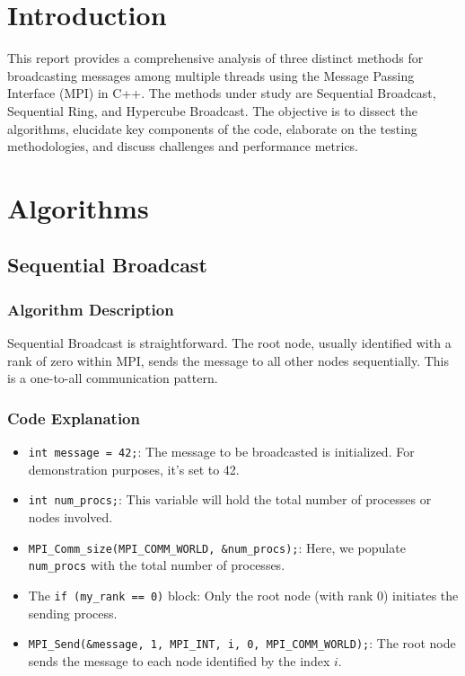 \documentclass[11pt]{article}
\begin{document}
\maketitle
\thispagestyle{empty}
\newpage

\tableofcontents
\newpage

\section{Introduction}
This report provides a comprehensive analysis of three distinct methods for broadcasting messages among multiple threads using the Message Passing Interface (MPI) in C++. The methods under study are Sequential Broadcast, Sequential Ring, and Hypercube Broadcast. The objective is to dissect the algorithms, elucidate key components of the code, elaborate on the testing methodologies, and discuss challenges and performance metrics.

\section{Algorithms}

\subsection{Sequential Broadcast}

\subsubsection{Algorithm Description}
Sequential Broadcast is straightforward. The root node, usually identified with a rank of zero within MPI, sends the message to all other nodes sequentially. This is a one-to-all communication pattern.

\subsubsection{Code Explanation}
\begin{itemize}
    \item \texttt{int message = 42;}: The message to be broadcasted is initialized. For demonstration purposes, it's set to 42.
    \item \texttt{int num\_procs;}: This variable will hold the total number of processes or nodes involved.
    \item \texttt{MPI\_Comm\_size(MPI\_COMM\_WORLD, \&num\_procs);}: Here, we populate \texttt{num\_procs} with the total number of processes.
    \item The \texttt{if (my\_rank == 0)} block: Only the root node (with rank 0) initiates the sending process.
    \item \texttt{MPI\_Send(\&message, 1, MPI\_INT, i, 0, MPI\_COMM\_WORLD);}: The root node sends the message to each node identified by the index \(i\).
\end{itemize}
\end{document}
